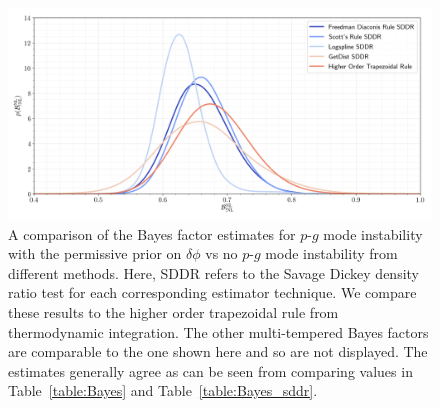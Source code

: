 \begin{figure}[th]
\centering
\includegraphics[width=1.0\textwidth]{figs/chapter6/sddr_bayes_factor.png}
\caption{A comparison of the Bayes factor estimates for $p$-$g$ mode instability with the permissive prior on $\delta \phi$ vs no $p$-$g$ mode instability from different methods. Here, SDDR refers to the Savage Dickey density ratio test for each corresponding estimator technique. We compare these results to the higher order trapezoidal rule from thermodynamic integration. The other multi-tempered Bayes factors are comparable to the one shown here and so are not displayed. The estimates generally agree as can be seen from comparing values in Table~\ref{table:Bayes} and Table~\ref{table:Bayes_sddr}.}
\label{fig:sddr_bayes_factor_comparisons}
\end{figure}


